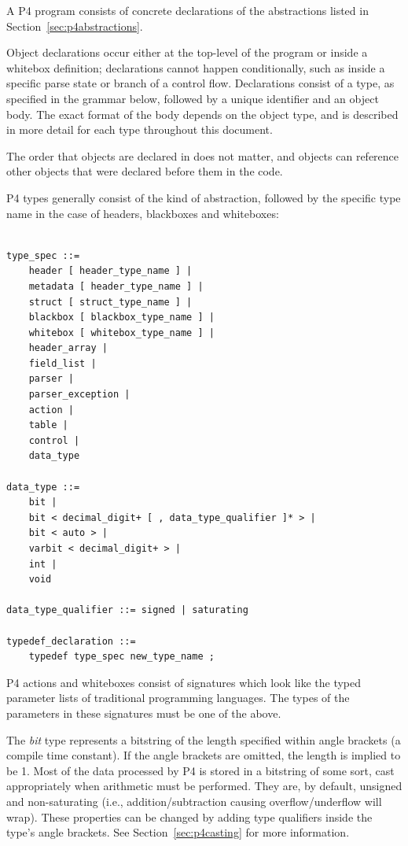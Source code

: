 \documentclass[12pt]{article}
\begin{document}

A P4 program consists of concrete declarations of the abstractions listed in
Section~\ref{sec:p4abstractions}.

Object declarations occur either at the top-level of the program or inside a
whitebox definition; declarations cannot happen conditionally, such as inside
a specific parse state or branch of a control flow. Declarations consist of
a type, as specified in the grammar below, followed by a unique identifier
and an object body. The exact format of the body depends on the object type,
and is described in more detail for each type throughout this document.

The order that objects are declared in does not matter, and objects can
reference other objects that were declared before them in the code.

P4 types generally consist of the kind of abstraction, followed by the specific
type name in the case of headers, blackboxes and whiteboxes:

\begin{lstlisting}[style=BNFstyle]

type_spec ::=
    header [ header_type_name ] |
    metadata [ header_type_name ] |
    struct [ struct_type_name ] |
    blackbox [ blackbox_type_name ] |
    whitebox [ whitebox_type_name ] |
    header_array |
    field_list |
    parser |
    parser_exception |
    action |
    table |
    control |
    data_type

data_type ::=
    bit |
    bit < decimal_digit+ [ , data_type_qualifier ]* > |
    bit < auto > |
    varbit < decimal_digit+ > |
    int | 
    void

data_type_qualifier ::= signed | saturating

typedef_declaration ::=
    typedef type_spec new_type_name ;

\end{lstlisting}

P4 actions and whiteboxes consist of signatures which look like the typed
parameter lists of traditional programming languages. The types of the
parameters in these signatures must be one of the above.

The \textit{bit} type represents a bitstring of the length specified within
angle brackets (a compile time constant). If the angle brackets are omitted, the
length is implied to be 1. Most of the data processed by P4 is stored in a
bitstring of some sort, cast appropriately when arithmetic must be performed.
They are, by default, unsigned and non-saturating (i.e., addition/subtraction
causing overflow/underflow will wrap). These properties can be changed by adding
type qualifiers inside the type's angle brackets. See
Section~\ref{sec:p4casting} for more information.
\end{document}
